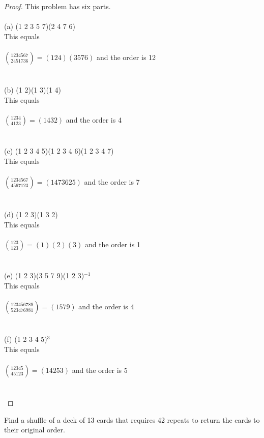 \documentclass[12pt]{article}
\newenvironment{problem}[2][Problem]{\begin{trivlist}
\item[\hskip \labelsep {\bfseries #1}\hskip \labelsep {\bfseries #2.}]}{\end{trivlist}}
\begin{document}
\begin{proof}
This problem has six parts. \\ \\
(a) (1 2 3 5 7)(2 4 7 6) \\ 
This equals \\ \\ 
$\displaystyle{1234567 \choose 2451736} = (124)(3576)$ and the order is 12 \\ \\ \\
(b) (1 2)(1 3)(1 4) \\
This equals \\ \\
$\displaystyle{1234 \choose 4123} = (1432)$ and the order is 4 \\ \\ \\
(c) (1 2 3 4 5)(1 2 3 4 6)(1 2 3 4 7) \\
This equals \\ \\
$\displaystyle{1234567 \choose 4567123} = (1473625)$ and the order is 7 \\ \\ \\
(d) (1 2 3)(1 3 2) \\
This equals \\ \\
$\displaystyle{123 \choose 123} = (1)(2)(3)$ and the order is 1 \\ \\ \\
(e) (1 2 3)(3 5 7 9)(1 2 3)$^{-1}$ \\
This equals \\ \\
$\displaystyle{123456789 \choose 523476981} = (1579)$ and the order is 4 \\ \\ \\
(f) (1 2 3 4 5)$^3$ \\ 
This equals \\ \\
$\displaystyle{12345 \choose 45123} = (14253)$ and the order is 5 \\ \\ \\
\end{proof}
 
\begin{problem}{3.2.6}
Find a shuffle of a deck of 13 cards that requires 42 repeats to return the cards to their original order.
\end{problem}
\end{document}
